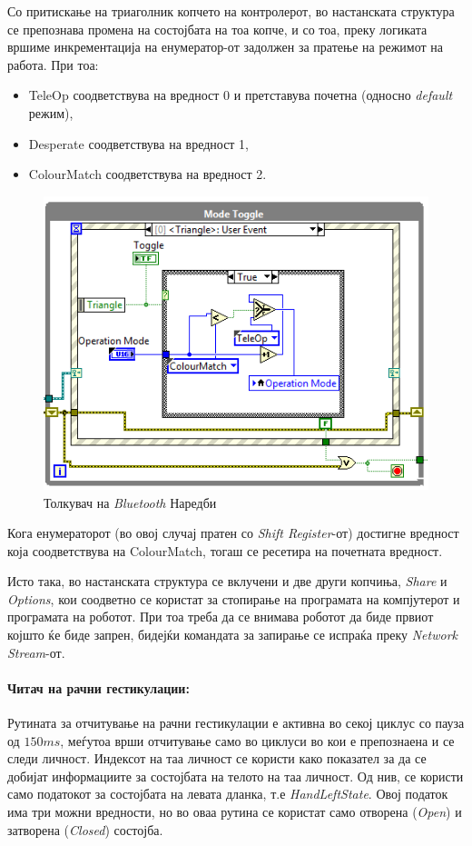 \documentclass[12pt]{article}
\begin{document}
      Со притискање на триаголник копчето на контролерот, во настанската структура се препознава промена на состојбата на тоа копче, и со тоа, преку логиката вршиме инкрементација на енумератор-от задолжен за пратење на режимот на работа. При тоа:

      \begin{itemize}
        \item TeleOp соодветствува на вредност 0 и претставува почетна (односно \textit{default} режим),
        \item Desperate соодветствува на вредност 1,
        \item ColourMatch соодветствува на вредност 2.
        \end{itemize}

      \begin{figure}[H]
        \centering
        \includegraphics[width=0.75\linewidth]{./images/mode_switch.png}
        \caption{Толкувач на \textit{Bluetooth} Наредби}
        \end{figure}

      Кога енумераторот (во овој случај пратен со \textit{Shift Register}-от) достигне вредност која соодветствува на ColourMatch, тогаш се ресетира на почетната вредност.

      Исто така, во настанската структура се вклучени и две други копчиња, \textit{Share} и \textit{Options}, кои соодветно се користат за стопирање на програмата на компјутерот и програмата на роботот. При тоа треба да се внимава роботот да биде првиот којшто ќе биде запрен, бидејќи командата за запирање се испраќа преку \textit{Network Stream}-от.

    \paragraph{Читач на рачни гестикулации:\\}
      Рутината за отчитување на рачни гестикулации е активна во секој циклус со пауза од $150ms$, меѓутоа врши отчитување само во циклуси во кои е препознаена и се следи личност. Индексот на таа личност се користи како показател за да се добијат информациите за состојбата на телото на таа личност. Од нив, се користи само податокот за состојбата на левата дланка, т.е \textit{HandLeftState}. Овој податок има три можни вредности, но во оваа рутина се користат само отворена (\textit{Open}) и затворена (\textit{Closed}) состојба.
\end{document}
